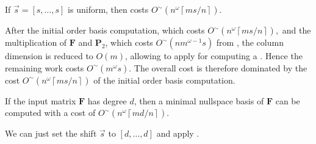 \begin{lem}
\label{lem:costOfMinimalNullspaceBasisWithUniformShift}If $\vec{s}=\left[s,\dots,s\right]$
is uniform, then  costs $O^{\sim}\left(n^{\omega}\left\lceil ms/n\right\rceil \right)$. \end{lem}
\begin{pf}
After the initial order basis computation, which costs $O^{\sim}\left(n^{\omega}\left\lceil ms/n\right\rceil \right),$
and the multiplication of $\mathbf{F}$ and $\mathbf{P}_{2}$, which
costs $O^{\sim}\left(nm^{\omega-1}s\right)$ from ,
the column dimension is reduced to $O\left(m\right)$, allowing 
to apply for computing a . Hence the remaining work costs $O^{\sim}\left(m^{\omega}s\right)$.
The overall cost is therefore dominated by the cost $O^{\sim}\left(n^{\omega}\left\lceil ms/n\right\rceil \right)$
of the initial order basis computation.\end{pf}
\begin{thm}
\label{cor:costOfMinimalNullspaceBasis}If the input matrix $\mathbf{F}$
has degree $d$, then a minimal nullspace basis of $\mathbf{F}$ can
be computed with a cost of $O^{\sim}\left(n^{\omega}\left\lceil md/n\right\rceil \right)$. \end{thm}
\begin{pf}
We can just set the shift $\vec{s}$ to $\left[d,\dots,d\right]$
and apply .\end{pf}


